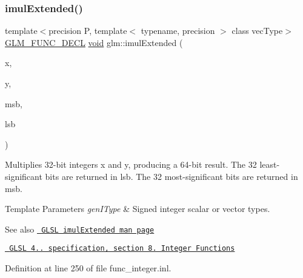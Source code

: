 \subsubsection{\texorpdfstring{imulExtended()}{imulExtended()}}
{\footnotesize\ttfamily template$<$precision P, template$<$ typename, precision $>$ class vec\+Type$>$ \\
\mbox{\hyperlink{setup_8hpp_ab2d052de21a70539923e9bcbf6e83a51}{G\+L\+M\+\_\+\+F\+U\+N\+C\+\_\+\+D\+E\+CL}} \mbox{\hyperlink{glad_8h_a950fc91edb4504f62f1c577bf4727c29}{void}} glm\+::imul\+Extended (\begin{DoxyParamCaption}\item[{vec\+Type$<$ int, P $>$ const \&}]{x,  }\item[{vec\+Type$<$ int, P $>$ const \&}]{y,  }\item[{vec\+Type$<$ int, P $>$ \&}]{msb,  }\item[{vec\+Type$<$ int, P $>$ \&}]{lsb }\end{DoxyParamCaption})}

Multiplies 32-\/bit integers x and y, producing a 64-\/bit result. The 32 least-\/significant bits are returned in lsb. The 32 most-\/significant bits are returned in msb.


\begin{DoxyTemplParams}{Template Parameters}
{\em gen\+I\+Type} & Signed integer scalar or vector types.\\
\hline
\end{DoxyTemplParams}
\begin{DoxySeeAlso}{See also}
\href{http://www.opengl.org/sdk/docs/manglsl/xhtml/imulExtended.xml}{\texttt{ G\+L\+SL imul\+Extended man page}} 

\href{http://www.opengl.org/registry/doc/GLSLangSpec.4.20.8.pdf}{\texttt{ G\+L\+SL 4.. specification, section 8. Integer Functions}} 
\end{DoxySeeAlso}


Definition at line 250 of file func\+\_\+integer.\+inl.

\mbox{\label{group__core__func__integer_ga2fc1a46e7b7e9fbbd8fa444fbacaa2aa}} 
